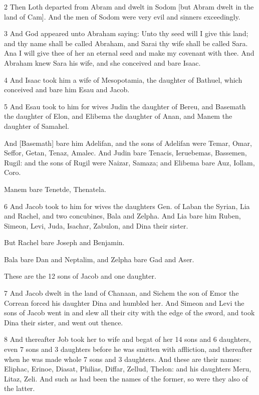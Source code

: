 \par 2 Then Loth departed from Abram and dwelt in Sodom [but Abram dwelt in the land of Cam]. And the men of Sodom were very evil and sinners exceedingly.

\par 3 And God appeared unto Abraham saying: Unto thy seed will I give this land; and thy name shall be called Abraham, and Sarai thy wife shall be called Sara. Ana I will give thee of her an eternal seed and make my covenant with thee. And Abraham knew Sara his wife, and she conceived and bare Isaac.

\par 4 And Isaac took him a wife of Mesopotamia, the daughter of Bathuel, which conceived and bare him Esau and Jacob. 

\par 5 And Esau took to him for wives Judin the daughter of Bereu, and Basemath the daughter of Elon, and Elibema the daughter of Anan, and Manem the daughter of Samahel.

\par And [Basemath] bare him Adelifan, and the sons of Adelifan were Temar, Omar, Seffor, Getan, Tenaz, Amalec. And Judin bare Tenacis, Ieruebemas, Bassemen, Rugil: and the sons of Rugil were Naizar, Samaza; and Elibema bare Auz, Iollam, Coro.

\par Manem bare Tenetde, Thenatela.

\par 6 And Jacob took to him for wives the daughters Gen. of Laban the Syrian, Lia and Rachel, and two concubines, Bala and Zelpha. And Lia bare him Ruben, Simeon, Levi, Juda, Isachar, Zabulon, and Dina their sister.

\par But Rachel bare Joseph and Benjamin.

\par Bala bare Dan and Neptalim, and Zelpha bare Gad and Aser.

\par These are the 12 sons of Jacob and one daughter.

\par 7 And Jacob dwelt in the land of Chanaan, and Sichem the son of Emor the Correan forced his daughter Dina and humbled her. And Simeon and Levi the sons of Jacob went in and slew all their city with the edge of the sword, and took Dina their sister, and went out thence. 

\par 8 And thereafter Job took her to wife and begat of her 14 sons and 6 daughters, even 7 sons and 3 daughters before he was smitten with affliction, and thereafter when he was made whole 7 sons and 3 daughters. And these are their names: Eliphac, Erinoe, Diasat, Philias, Diffar, Zellud, Thelon: and his daughters Meru, Litaz, Zeli. And such as had been the names of the former, so were they also of the latter.

